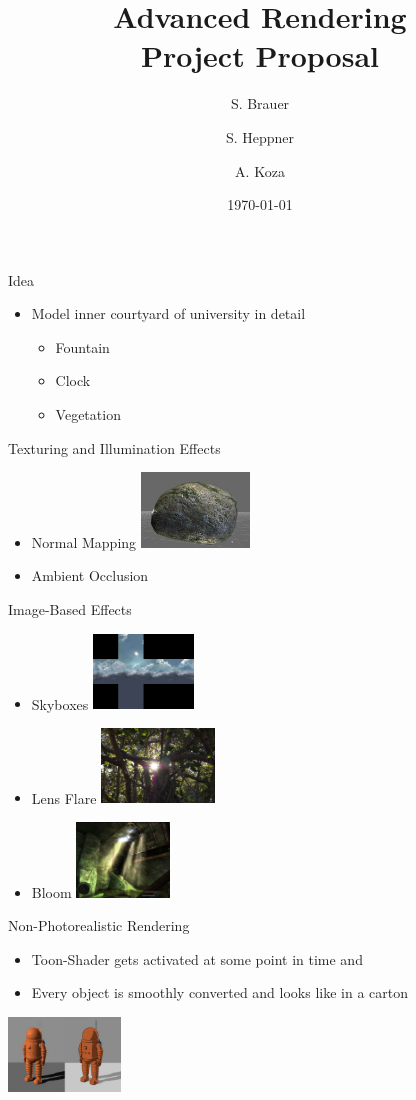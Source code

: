 \documentclass{beamer}
\title[Project Proposal]{Advanced Rendering \\ Project Proposal}
\author[Brauer, Heppner, Koza]
{S. Brauer \and S. Heppner \and A. Koza}
\institute[University of Paderborn]{Institute for Computer Science}
\date{\today}
\begin{document}
\begin{frame}
  \titlepage
\end{frame}

\begin{frame}{Idea}
	\begin{itemize}
		\item Model inner courtyard of university in detail
		\begin{itemize}
			\item Fountain
			\item Clock
			\item Vegetation
		\end{itemize}
	\end{itemize}	
\end{frame}

\begin{frame}{Texturing and Illumination Effects}
	\begin{itemize}
		\item Normal Mapping
		\includegraphics[height=2cm]{figures/normal_map_stone.jpg}
		\item Ambient Occlusion
	\end{itemize}
\end{frame}

\begin{frame}{Image-Based Effects}
	\begin{itemize}
		\item Skyboxes
		\includegraphics[height=2cm]{figures/skybox.jpg}
		\item Lens Flare
		\includegraphics[height=2cm]{figures/lens_flare_tree.jpg}
		\item Bloom
		\includegraphics[height=2cm]{figures/bloom.jpg}
	\end{itemize}
\end{frame}

\begin{frame}{Non-Photorealistic Rendering}
	\begin{itemize}
		\item Toon-Shader gets activated at some point in time and
		\item Every object is smoothly converted and looks like in a carton
	\end{itemize}
	\includegraphics[height=2cm]{figures/toon_shader.jpg}
\end{frame}
\end{document}

